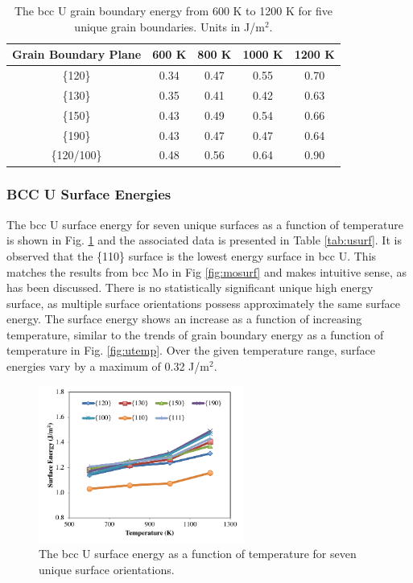 \documentclass[review]{elsarticle}
\begin{document}
\FloatBarrier

\begin{table}[h]
\caption{The bcc U grain boundary energy from 600 K to 1200 K for five unique grain boundaries. Units in J/m$^{2}$. } \label{tab:utemp}
\begin{center}
\begin{tabular}{|c|c|c|c|c|}
	\hline
	Grain Boundary Plane & 600 K & 800 K & 1000 K & 1200 K \\
	 \hline
	 \{120\} & 0.34 & 0.47 & 0.55 & 0.70 \\
	 \{130\} & 0.35 & 0.41 & 0.42 & 0.63 \\
	 \{150\} & 0.43 & 0.49 & 0.54 & 0.66 \\
	 \{190\} & 0.43 & 0.47 & 0.47 & 0.64 \\
	 \{120/100\} & 0.48 & 0.56 & 0.64 & 0.90 \\	 
	 \hline
\end{tabular}
\end{center}
\label{default}
\end{table}

\FloatBarrier


\subsubsection{BCC U Surface Energies}

The bcc U surface energy for seven unique surfaces as a function of temperature is shown in Fig. \ref{fig:usurf} and the associated data is presented in Table \ref{tab:usurf}. It is observed that the \{110\} surface is the lowest energy surface in bcc U. This matches the results from bcc Mo in Fig \ref{fig:mosurf} and makes intuitive sense, as has been discussed. There is no statistically significant unique high energy surface, as multiple surface orientations possess approximately the same surface energy. The surface energy shows an increase as a function of increasing temperature, similar to the trends of grain boundary energy as a function of temperature in Fig. \ref{fig:utemp}. Over the given temperature range, surface energies vary by a maximum of 0.32 J/m$^{2}$.

\begin{figure}[h]
 \centering
 \includegraphics[width=0.6\textwidth]{usurf.png} 
 \caption{The bcc U surface energy as a function of temperature for seven unique surface orientations.}
 \label{fig:usurf}
\end{figure}
\end{document}
